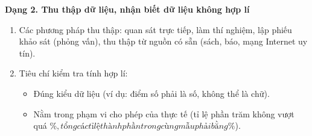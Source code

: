 \textbf{Dạng 2. Thu thập dữ liệu, nhận biết dữ liệu không hợp lí}
\begin{enumerate}
\item Các phương pháp thu thập: quan sát trực tiếp, làm thí nghiệm, lập phiếu khảo sát (phỏng vấn), thu thập từ nguồn có sẵn (sách, báo, mạng Internet uy tín).
\item Tiêu chí kiểm tra tính hợp lí:
\begin{itemize}
\item Đúng kiểu dữ liệu (ví dụ: điểm số phải là số, không thể là chữ).
\item Nằm trong phạm vi cho phép của thực tế (tỉ lệ phần trăm không vượt quá \%$, tổng các tỉ lệ thành phần trong cùng mẫu phải bằng \%$).
\end{itemize}
\end{enumerate}

